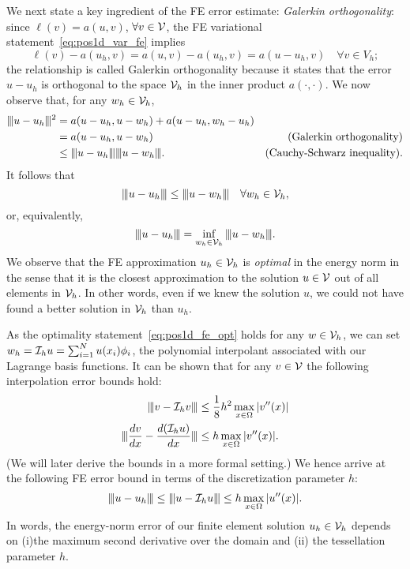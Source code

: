 We next state a key ingredient of the FE error estimate: \emph{Galerkin orthogonality}: since $\ell(v) = a(u,v)$, $\forall v \in \mathcal{V}$, the FE variational statement~\eqref{eq:pos1d_var_fe} implies
\begin{equation*}
  \ell(v) - a(u_h,v) = a(u,v) - a(u_h,v) = a(u-u_h,v) \quad \forall v \in V_h;
\end{equation*}
the relationship is called Galerkin orthogonality because it states that the error $u - u_h$ is orthogonal to the space $\mathcal{V}_h$ in the inner product $a(\cdot,\cdot)$. We now observe that, for any $w_h \in \mathcal{V}_h$,
\begin{align*}
  |\kern-1pt|\kern-1pt| u-u_h |\kern-1pt|\kern-1pt|^2
  &=
  a(u-u_h, u-w_h) + a(u-u_h,w_h - u_h)
  \\
  &=
  a(u-u_h, u - w_h) & \text{(Galerkin orthogonality)}
  \\
  &\leq  |\kern-1pt|\kern-1pt| u - u_h |\kern-1pt|\kern-1pt| |\kern-1pt|\kern-1pt| u - w_h |\kern-1pt|\kern-1pt|. & \text{(Cauchy-Schwarz inequality)}.
\end{align*}
It follows that
\begin{equation}
  |\kern-1pt|\kern-1pt| u - u_h |\kern-1pt|\kern-1pt| \leq |\kern-1pt|\kern-1pt| u - w_h |\kern-1pt|\kern-1pt| \quad \forall w_h \in \mathcal{V}_h,
  \label{eq:pos1d_fe_opt}
\end{equation}
or, equivalently,
\begin{equation*}
  |\kern-1pt|\kern-1pt| u-u_h |\kern-1pt|\kern-1pt| = \inf_{w_h \in \mathcal{V}_h} |\kern-1pt|\kern-1pt| u - w_h |\kern-1pt|\kern-1pt|.
\end{equation*}
We observe that the FE approximation $u_h \in \mathcal{V}_h$ is \emph{optimal} in the energy norm in the sense that it is the closest approximation to the solution $u \in \mathcal{V}$ out of all elements in $\mathcal{V}_h$.  In other words, even if we knew the solution $u$, we could not have found a better solution in $\mathcal{V}_h$ than $u_h$.

As the optimality statement~\eqref{eq:pos1d_fe_opt} holds for any $w \in \mathcal{V}_h$, we can set $w_h = \mathcal{I}_h u = \sum_{i=1}^N u(x_i) \phi_i$, the polynomial interpolant associated with our Lagrange basis functions.  It can be shown that for any $v \in \mathcal{V}$ the following interpolation error bounds hold:
\begin{align*}
  |\kern-1pt|\kern-1pt| v - \mathcal{I}_h v |\kern-1pt|\kern-1pt| &\leq \frac{1}{8} h^2 \max_{x \in \Omega} |v''(x)| \\
  |\kern-1pt|\kern-1pt| \frac{d v}{d x} - \frac{d (\mathcal{I}_h u)}{d x} |\kern-1pt|\kern-1pt| &\leq h \max_{x \in \Omega} |v''(x)| .
\end{align*}
(We will later derive the bounds in a more formal setting.) We hence arrive at the following FE error bound in terms of the discretization parameter $h$:
\begin{equation*}
  |\kern-1pt|\kern-1pt| u - u_h |\kern-1pt|\kern-1pt| \leq |\kern-1pt|\kern-1pt| u - \mathcal{I}_h u |\kern-1pt|\kern-1pt| \leq h \max_{x \in \Omega}  | u''(x) |.
\end{equation*}
In words, the energy-norm error of our finite element solution $u_h \in \mathcal{V}_h$  depends on  (i)the maximum second derivative over the domain and (ii) the tessellation parameter $h$.


